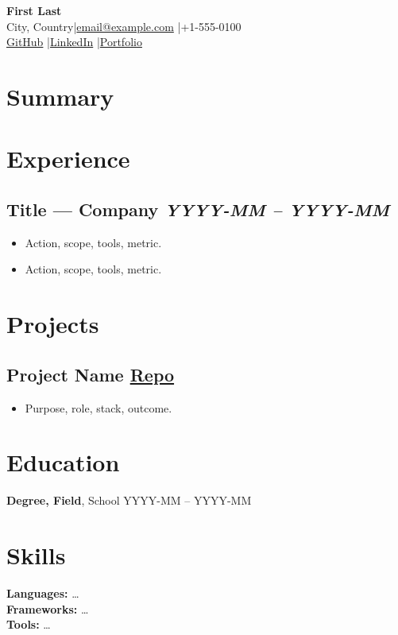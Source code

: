 \documentclass[9pt,letterpaper]{article}
\makeatletter
\newcommand{\Name}{First Last}
\newcommand{\Email}{email@example.com}
\newcommand{\Phone}{+1-555-0100}
\newcommand{\Location}{City, Country}
\newcommand{\LinkedIn}{https://linkedin.com/in/username}
\newcommand{\GitHub}{https://github.com/username}
\newcommand{\Portfolio}{https://example.com}
\makeatother
\begin{document}
\begin{center}
  {\Large\bfseries \Name}\\[0.15em]
  {\small \Location \quad|\quad \href{mailto:\Email}{\Email} \quad|\quad \Phone}\\[0.1em]
  {\small \href{\GitHub}{GitHub} \quad|\quad \href{\LinkedIn}{LinkedIn} \quad|\quad \href{\Portfolio}{Portfolio}}
\end{center}

\section{Summary}

\section{Experience}
\subsection{Title --- Company \hfill {\normalsize\mdseries\textit{YYYY-MM -- YYYY-MM}}}
\begin{itemize}
  \item Action, scope, tools, metric.
  \item Action, scope, tools, metric.
\end{itemize}

\section{Projects}
\subsection{Project Name \hfill {\normalsize\mdseries\href{https://github.com/org/repo}{Repo}}}
\begin{itemize}
  \item Purpose, role, stack, outcome.
\end{itemize}

\section{Education}
\textbf{Degree, Field}, School \hfill YYYY-MM -- YYYY-MM

\section{Skills}
\textbf{Languages:} \ldots\\
\textbf{Frameworks:} \ldots\\
\textbf{Tools:} \ldots
\end{document}
